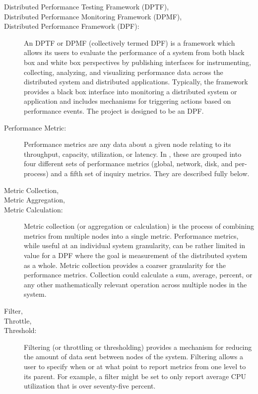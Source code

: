 \begin{description}

\item[Distributed Performance Testing Framework (DPTF),]
\item[Distributed Performance Monitoring Framework (DPMF),]
\item[Distributed Performance Framework (DPF):]
An DPTF or DPMF (collectively termed DPF) is a framework which allows its users to evaluate the performance of a system from both black box and white box perspectives by publishing interfaces for instrumenting, collecting, analyzing, and visualizing performance data across the distributed system and distributed applications.
Typically, the framework provides a black box interface into monitoring a distributed system or application and includes mechanisms for triggering actions based on performance events.
The \dcamp project is designed to be an DPF. 

\item[Performance Metric:]
Performance metrics are any data about a given node relating to its throughput, capacity, utilization, or latency.
In \dcamp, these are grouped into four different sets of performance metrics (global, network, disk, and per-process) and a fifth set of inquiry metrics.
They are described fully below. 

\item[Metric Collection,]
\item[Metric Aggregation,]
\item[Metric Calculation:]
Metric collection (or aggregation or calculation) is the process of combining metrics from multiple nodes into a single metric.
Performance metrics, while useful at an individual system granularity, can be rather limited in value for a DPF where the goal is measurement of the distributed system as a whole.
Metric collection provides a coarser granularity for the performance metrics.
Collection could calculate a sum, average, percent, or any other mathematically relevant operation across multiple nodes in the system. 

\item[Filter,]
\item[Throttle,]
\item[Threshold:]
Filtering (or throttling or thresholding) provides a mechanism for reducing the amount of data sent between nodes of the system.
Filtering allows a user to specify when or at what point to report metrics from one level to its parent.
For example, a filter might be set to only report average CPU utilization that is over seventy-five percent. 


\end{description}
